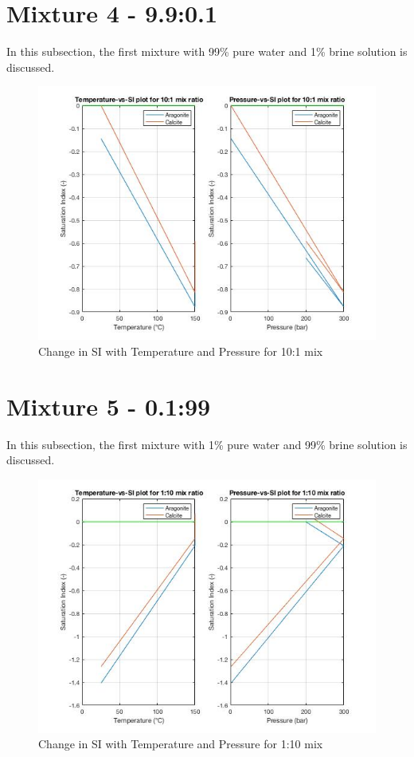 \section{Mixture 4 - 9.9:0.1}
In this subsection, the first mixture with 99\% pure water and 1\% brine solution is discussed. 


\begin{figure}
    \centering
    \includegraphics[scale=0.7]{10-1ratio.jpg}
    \caption{Change in SI with Temperature and Pressure for 10:1 mix }
    \label{fig:10-1}
\end{figure}

\section{Mixture 5 - 0.1:99}
In this subsection, the first mixture with 1\% pure water and 99\% brine solution is discussed. 
\begin{figure}
    \centering
    \includegraphics[scale=0.7]{1-10ratio.jpg}
    \caption{Change in SI with Temperature and Pressure for 1:10 mix }
    \label{fig:1-10}
\end{figure}